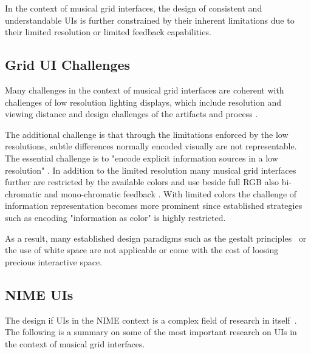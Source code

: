 \documentclass[sigconf]{nimeart}
\begin{document}
In the context of musical grid interfaces, the design of consistent and understandable UIs is further constrained by their inherent limitations due to their limited resolution or limited feedback capabilities.

\subsection{Grid UI Challenges}\label{grid-ui-challenges}

Many challenges in the context of musical grid interfaces are coherent with challenges of low resolution lighting displays, which include resolution and viewing distance \cite{7237920} and design challenges of the artifacts and process \cite{10.1145U002F3205873.3205876}.

The additional challenge is that through the limitations enforced by the low resolutions, subtle differences normally encoded visually are not representable. The essential challenge is to "encode explicit information sources in a low resolution" \cite{10.1145U002F3173574.3173833}. In addition to the limited resolution many musical grid interfaces further are restricted by the available colors and use beside full RGB also bi-chromatic and mono-chromatic feedback \cite{Rossmy2021Musical}. With limited colors the challenge of information representation becomes more prominent since established strategies such as encoding "information as color" \cite{10.1145U002F2682884.2682886} is highly restricted.

As a result, many established design paradigms such as the gestalt principles~\cite{2008,1935} or the use of white space \cite{coursaris2012web} are not applicable or come with the cost of loosing precious interactive space.

\subsection{NIME UIs}\label{nime-uis}

The design if UIs in the NIME context is a complex field of research in itself~\cite{Dobrian2006,Rossmy2019}. The following is a summary on some of the most important research on UIs in the context of musical grid interfaces.
\end{document}
